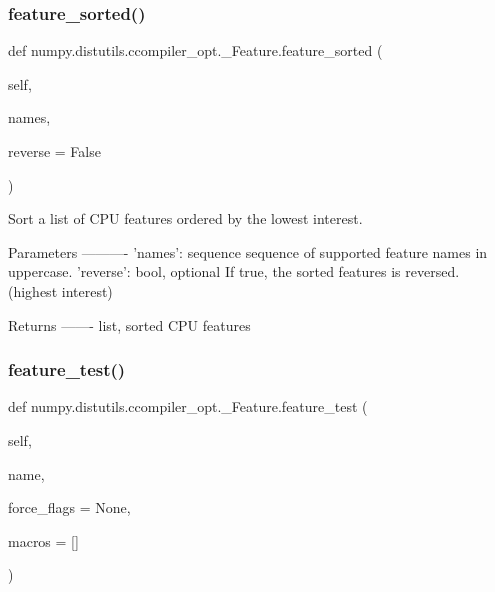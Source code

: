 \subsubsection{\texorpdfstring{feature\+\_\+sorted()}{feature\_sorted()}}
{\footnotesize\ttfamily def numpy.\+distutils.\+ccompiler\+\_\+opt.\+\_\+\+Feature.\+feature\+\_\+sorted (\begin{DoxyParamCaption}\item[{}]{self,  }\item[{}]{names,  }\item[{}]{reverse = {\ttfamily False} }\end{DoxyParamCaption})}

\begin{DoxyVerb}Sort a list of CPU features ordered by the lowest interest.

Parameters
----------
'names': sequence
    sequence of supported feature names in uppercase.
'reverse': bool, optional
    If true, the sorted features is reversed. (highest interest)

Returns
-------
list, sorted CPU features
\end{DoxyVerb}
 \mbox{\label{classnumpy_1_1distutils_1_1ccompiler__opt_1_1__Feature_a06dd4af410f1c755833654f3838427a6}} 
\subsubsection{\texorpdfstring{feature\+\_\+test()}{feature\_test()}}
{\footnotesize\ttfamily def numpy.\+distutils.\+ccompiler\+\_\+opt.\+\_\+\+Feature.\+feature\+\_\+test (\begin{DoxyParamCaption}\item[{}]{self,  }\item[{}]{name,  }\item[{}]{force\+\_\+flags = {\ttfamily None},  }\item[{}]{macros = {\ttfamily \mbox{[}\mbox{]}} }\end{DoxyParamCaption})}

